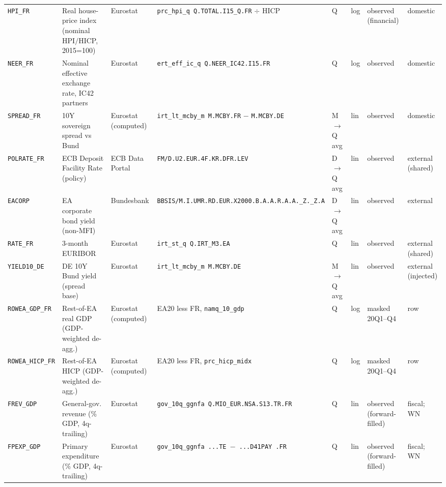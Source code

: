 \begin{longtable}{@{}p{}p{}p{}p{}p{}p{}p{}p{}@{}}
\texttt{HPI\_FR}    & Real house-price index (nominal HPI$/$HICP, 2015=100) & Eurostat & \texttt{prc\_hpi\_q Q.\allowbreak TOTAL.\allowbreak I15\_Q.\allowbreak FR} $\div$ HICP & Q & log & observed (financial) & domestic \\
\texttt{NEER\_FR}   & Nominal effective exchange rate, IC42 partners & Eurostat & \texttt{ert\_eff\_ic\_q Q.\allowbreak NEER\_IC42.\allowbreak I15.\allowbreak FR} & Q & log & observed & domestic \\
\texttt{SPREAD\_FR} & 10Y sovereign spread vs Bund & Eurostat (computed) & \texttt{irt\_lt\_mcby\_m M.\allowbreak MCBY.\allowbreak FR} $-$ \texttt{M.\allowbreak MCBY.\allowbreak DE} & M$\to$Q avg & lin & observed & domestic \\
\texttt{POLRATE\_FR}& ECB Deposit Facility Rate (policy) & ECB Data Portal & \texttt{FM/D.\allowbreak U2.\allowbreak EUR.4F.\allowbreak KR.\allowbreak DFR.\allowbreak LEV} & D$\to$Q avg & lin & observed & external (shared) \\
\texttt{EACORP}     & EA corporate bond yield (non-MFI) & Bundesbank & \texttt{BBSIS/\allowbreak M.\allowbreak I.\allowbreak UMR.\allowbreak RD.\allowbreak EUR.\allowbreak X2000.\allowbreak B.A.A.\allowbreak R.A.A.\allowbreak \_Z.\_Z.A} & D$\to$Q avg & lin & observed & external \\
\texttt{RATE\_FR}   & 3-month EURIBOR & Eurostat & \texttt{irt\_st\_q Q.\allowbreak IRT\_M3.\allowbreak EA} & Q & lin & observed & external (shared) \\
\texttt{YIELD10\_DE}& DE 10Y Bund yield (spread base) & Eurostat & \texttt{irt\_lt\_mcby\_m M.\allowbreak MCBY.\allowbreak DE} & M$\to$Q avg & lin & observed & external (injected) \\
\texttt{ROWEA\_GDP\_FR}  & Rest-of-EA real GDP (GDP-weighted de-agg.) & Eurostat (computed) & EA20 less FR, \texttt{namq\_10\_gdp} & Q & log & masked 20Q1--Q4 & row \\
\texttt{ROWEA\_HICP\_FR} & Rest-of-EA HICP (GDP-weighted de-agg.) & Eurostat (computed) & EA20 less FR, \texttt{prc\_hicp\_midx} & Q & log & masked 20Q1--Q4 & row \\
\texttt{FREV\_GDP}  & General-gov. revenue (\% GDP, 4q-trailing) & Eurostat & \texttt{gov\_10q\_ggnfa Q.\allowbreak MIO\_EUR.\allowbreak NSA.\allowbreak S13.\allowbreak TR.\allowbreak FR} & Q & lin & observed (forward-filled) & fiscal; WN \\
\texttt{FPEXP\_GDP} & Primary expenditure (\% GDP, 4q-trailing) & Eurostat & \texttt{gov\_10q\_ggnfa ...\allowbreak TE $-$ ...\allowbreak D41PAY .\allowbreak FR} & Q & lin & observed (forward-filled) & fiscal; WN \\

\end{longtable}
